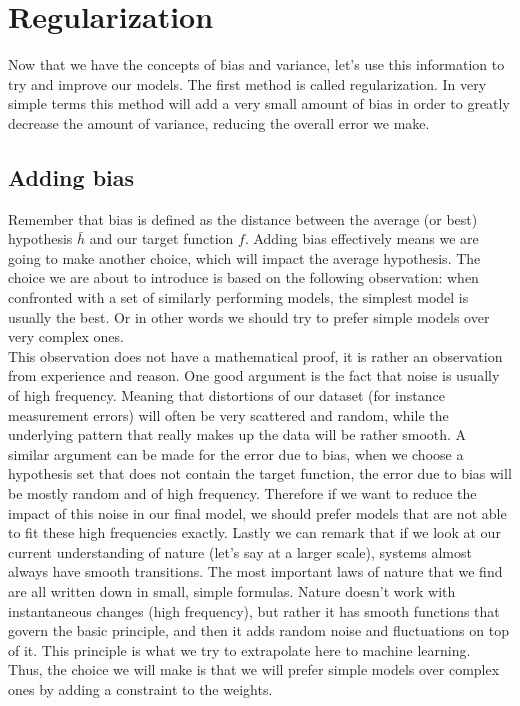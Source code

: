 \section{Regularization}
\label{sec:glm-regularization}
Now that we have the concepts of bias and variance, let's use this information to try and improve our models. The first method is called regularization\cite{caltechmachinelearning}\cite{zou2005regularization}\cite{friedman2010regularization}. In very simple terms this method will add a very small amount of bias in order to greatly decrease the amount of variance, reducing the overall error we make.
\subsection{Adding bias}
Remember that bias is defined as the distance between the average (or best) hypothesis $\bar{h}$ and our target function $f$. Adding bias effectively means we are going to make another choice, which will impact the average hypothesis. The choice we are about to introduce is based on the following observation: when confronted with a set of similarly performing models, the simplest model is usually the best. Or in other words we should try to prefer simple models over very complex ones. \\
This observation does not have a mathematical proof, it is rather an observation from experience and reason. One good argument is the fact that noise is usually of high frequency. Meaning that distortions of our dataset (for instance measurement errors) will often be very scattered and random, while the underlying pattern that really makes up the data will be rather smooth. A similar argument can be made for the error due to bias, when we choose a hypothesis set that does not contain the target function, the error due to bias will be mostly random and of high frequency. Therefore if we want to reduce the impact of this noise in our final model, we should prefer models that are not able to fit these high frequencies exactly. Lastly we can remark that if we look at our current understanding of nature (let's say at a larger scale), systems almost always have smooth transitions. The most important laws of nature that we find are all written down in small, simple formulas. Nature doesn't work with instantaneous changes (high frequency), but rather it has smooth functions that govern the basic principle, and then it adds random noise and fluctuations on top of it. This principle is what we try to extrapolate here to machine learning.\\
Thus, the choice we will make is that we will prefer simple models over complex ones by adding a constraint to the weights.
